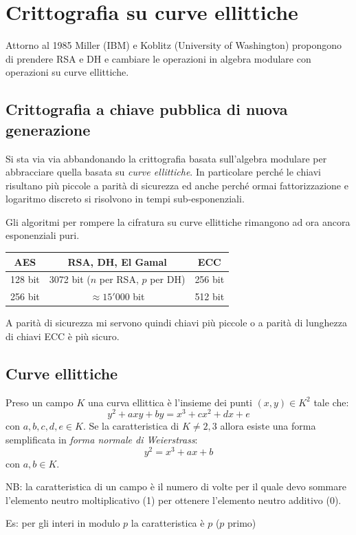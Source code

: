 \section{Crittografia su curve ellittiche}
Attorno al 1985 Miller (IBM) e Koblitz (University of Washington) propongono di prendere RSA e DH e cambiare le operazioni in algebra modulare con operazioni su curve ellittiche.

\subsection{Crittografia a chiave pubblica di nuova generazione}
Si sta via via abbandonando la crittografia basata sull'algebra modulare per abbracciare quella basata su \emph{curve ellittiche}.
In particolare perché le chiavi risultano più piccole a parità di sicurezza ed anche perché ormai fattorizzazione e logaritmo discreto si risolvono in tempi sub-esponenziali.

Gli algoritmi per rompere la cifratura su curve ellittiche rimangono ad ora ancora esponenziali puri.
\begin{table}[ht!]
    \centering
    \begin{tabular}{c|c|c}
        AES & RSA, DH, El Gamal & ECC \\
        \hline
        128 bit & 3072 bit ($n$ per RSA, $p$ per DH) & 256 bit \\
        256 bit & $\approx 15'000$ bit & 512 bit
    \end{tabular}
\end{table}

A parità di sicurezza mi servono quindi chiavi più piccole o a parità di lunghezza di chiavi ECC è più sicuro.

\subsection{Curve ellittiche}
Preso un campo $K$ una curva ellittica è l'insieme dei punti $(x,y) \in K^2$ tale che:
$$ y^2 + axy + by = x^3 + cx^2 + dx + e $$
con $a,b,c,d,e \in K$.
Se la caratteristica di $K \neq 2, 3$ allora esiste una forma semplificata in \emph{forma normale di Weierstrass}:
$$ y^2 = x^3 + ax + b $$
con $a,b \in K$.

NB: la caratteristica di un campo è il numero di volte per il quale devo sommare l'elemento neutro moltiplicativo (1) per ottenere l'elemento neutro additivo (0).

Es: per gli interi in modulo $p$ la caratteristica è $p$ ($p$ primo)

